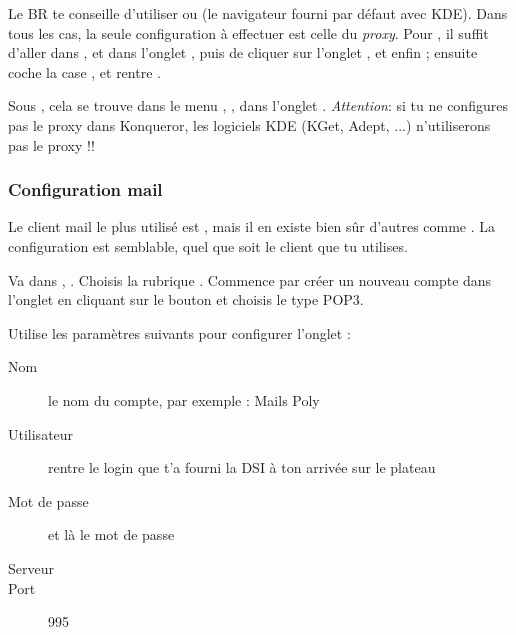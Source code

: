  Le BR te conseille d'utiliser  ou
 (le navigateur fourni par défaut avec KDE). Dans tous les cas, la seule
configuration à effectuer est celle du \emph{proxy}. Pour , il suffit d'aller dans
,  et dans l'onglet , puis de cliquer sur l'onglet
, et enfin  ; ensuite coche la case , et rentre .

Sous , cela se trouve dans le menu , ,
dans l'onglet . \emph{Attention}: si tu ne configures pas le proxy dans Konqueror,
les logiciels KDE (KGet, Adept, ...) n'utiliserons pas le proxy !!




\subsubsection{Configuration mail}

 Le client mail le plus
utilisé est , mais il en existe bien sûr d'autres comme
. La configuration est semblable, quel que soit le
client que tu utilises.

Va dans , . Choisis la
rubrique . Commence par créer un nouveau compte dans
l'onglet  en cliquant sur le bouton
 et choisis le type POP3.


Utilise les paramètres suivants pour configurer l'onglet
 :
\begin{description}
  \item[Nom] le nom du compte, par exemple : Mails Poly
  \item[Utilisateur] rentre le login  que t'a fourni la DSI à ton arrivée sur le plateau
  \item[Mot de passe] et là le mot de passe 
  \item[Serveur] 
  \item[Port] 995
\end{description}


